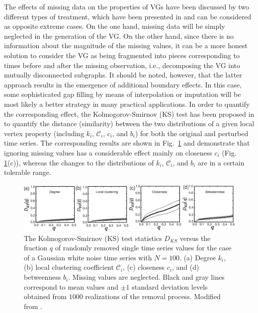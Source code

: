 		The effects of missing data on the properties of VGs have been discussed by two different types of treatment, which have been presented in \cite{Donner2012} and can be considered as opposite extreme cases. On the one hand, missing data will be simply neglected in the generation of the VG. On the other hand, since there is no information about the magnitude of the missing values, it can be a more honest solution to consider the VG as being fragmented into pieces corresponding to times before and after the missing observation, i.e., decomposing the VG into mutually disconnected subgraphs. It should be noted, however, that the latter approach results in the emergence of additional boundary effects. In this case, some sophisticated gap filling by means of interpolation or imputation will be most likely a better strategy in many practical applications. In order to quantify the corresponding effect, the Kolmogorov-Smirnov (KS) test has been proposed in \cite{Donner2012} to quantify the distance (similarity) between the two distributions of a given local vertex property (including $k_i$, $\mathcal{C}_i$, $c_i$, and $b_i$) for both the original and perturbed time series. The corresponding results are shown in Fig.~\ref{fig_chap04:missingD} and demonstrate that ignoring missing values has a considerable effect mainly on closeness $c_i$ (Fig. \ref{fig_chap04:missingD}(c)), whereas the changes to the distributions of $k_i$, $\mathcal{C}_i$, and $b_i$ are in a certain tolerable range. 
		\begin{figure}
		  \centering
		  \includegraphics[width=\columnwidth]{Chapter04_VisibilityGt/fig4N.eps}
		  \caption{The Kolmogorov-Smirnov (KS) test statistics $D_{KS}$ versus the fraction $q$ of randomly removed single time series values for the case of a Gaussian white noise time series with $N=100$. (a) Degree $k_i$, (b) local clustering coefficient $\mathcal{C}_i$, (c) closeness $c_i$, and (d) betweenness $b_i$. Missing values are neglected. Black and gray lines correspond to mean values and $\pm 1$ standard deviation levels obtained from $1000$ realizations of the removal process. Modified from \cite{Donner2012}. \label{fig_chap04:missingD}}
		\end{figure}
				
